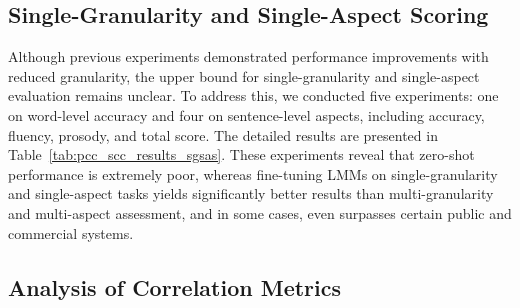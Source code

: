 \documentclass{article}
\begin{document}
\subsection{Single-Granularity and Single-Aspect Scoring}
\label{ssec:sgsas}

Although previous experiments demonstrated performance improvements with reduced granularity, the upper bound for single-granularity and single-aspect evaluation remains unclear. To address this, we conducted five experiments: one on word-level accuracy and four on sentence-level aspects, including accuracy, fluency, prosody, and total score. The detailed results are presented in Table~\ref{tab:pcc_scc_results_sgsas}. These experiments reveal that zero-shot performance is extremely poor, whereas fine-tuning LMMs on single-granularity and single-aspect tasks yields significantly better results than multi-granularity and multi-aspect assessment, and in some cases, even surpasses certain public and commercial systems.

\begin{table}[htbp]
\centering
\caption{PCC and SCC results for single-granularity and single-aspect APA tasks.}
\label{tab:pcc_scc_results_sgsas}
\end{table}

\subsection{Analysis of Correlation Metrics}
\label{ssec:analysis_pcc_scc}
\end{document}
